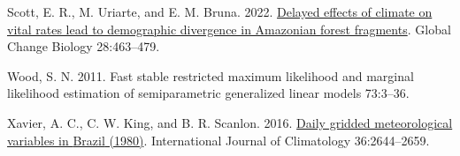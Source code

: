 \documentclass[
  12pt,
]{article}
\newlength{\cslhangindent}
\newlength{\cslentryspacingunit} %
\newenvironment{CSLReferences}[2] %
 {%
  \setlength{\parindent}{0pt}
  \ifodd #1
  \let\oldpar\par
  \def\par{\hangindent=\cslhangindent\oldpar}
  \fi
  \setlength{\parskip}{#2\cslentryspacingunit}
 }%
 {}
\begin{document}
\begin{CSLReferences}{0}{0}
\leavevmode{}%
Scott, E. R., M. Uriarte, and E. M. Bruna. 2022.
\href{https://doi.org/10.1111/gcb.15900}{Delayed effects of climate on
vital rates lead to demographic divergence in Amazonian forest
fragments}. Global Change Biology 28:463--479.

\leavevmode{}%
Wood, S. N. 2011. Fast stable restricted maximum likelihood and marginal
likelihood estimation of semiparametric generalized linear models
73:3--36.

\leavevmode{}%
Xavier, A. C., C. W. King, and B. R. Scanlon. 2016.
\href{https://doi.org/10.1002/joc.4518}{Daily gridded meteorological
variables in {Brazil} (1980)}. International Journal of
Climatology 36:2644--2659.

\end{CSLReferences}

\pagebreak
\end{document}
